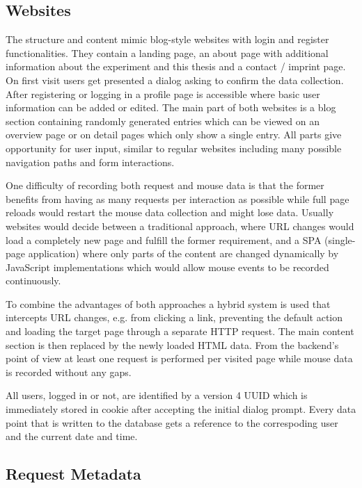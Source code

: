 \documentclass[
    fontsize=12pt,
    headings=small,
    parskip=half,           %
    bibliography=totoc,
    numbers=noenddot,       %
    open=any,               %
    final,                   %
    table
]{scrreprt}
\begin{document}
\label{concept_websites}
\subsection{Websites}

The structure and content mimic blog-style websites with login and register functionalities. They contain a landing page, an about page with additional information about the experiment and this thesis and a contact / imprint page. On first visit users get presented a dialog asking to confirm the data collection. After registering or logging in a profile page is accessible where basic user information can be added or edited. The main part of both websites is a blog section containing randomly generated entries which can be viewed on an overview page or on detail pages which only show a single entry.
All parts give opportunity for user input, similar to regular websites including many possible navigation paths and form interactions.

One difficulty of recording both request and mouse data is that the former benefits from having as many requests per interaction as possible while full page reloads would restart the mouse data collection and might lose data. Usually websites would decide between a traditional approach, where URL changes would load a completely new page and fulfill the former requirement, and a SPA (single-page application) where only parts of the content are changed dynamically by JavaScript implementations which would allow mouse events to be recorded continuously.

To combine the advantages of both approaches a hybrid system is used that intercepts URL changes, e.g. from clicking a link, preventing the default action and loading the target page through a separate HTTP request. The main content section is then replaced by the newly loaded HTML data. From the backend's point of view at least one request is performed per visited page while mouse data is recorded without any gaps.

All users, logged in or not, are identified by a version 4 UUID which is immediately stored in cookie after accepting the initial dialog prompt. Every data point that is written to the database gets a reference to the correspoding user and the current date and time.

\subsection{Request Metadata}
\end{document}

